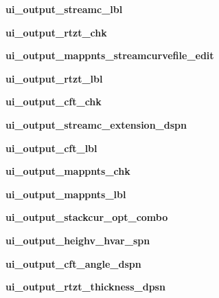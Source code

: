 \begin{DoxyCompactItemize}
\hypertarget{a00077_a1436e56fad76cd38cf1f87db08b539b8}{}\label{a00077_a1436e56fad76cd38cf1f87db08b539b8} 
{\bfseries ui\+\_\+output\+\_\+streamc\+\_\+lbl}
\item 
\hypertarget{a00077_a336846c91ac57b8ab8ab0f2b5c5a0b9e}{}\label{a00077_a336846c91ac57b8ab8ab0f2b5c5a0b9e} 
{\bfseries ui\+\_\+output\+\_\+rtzt\+\_\+chk}
\item 
\hypertarget{a00077_a806b947963fcab17402d6c5b4cc16368}{}\label{a00077_a806b947963fcab17402d6c5b4cc16368} 
{\bfseries ui\+\_\+output\+\_\+mappnts\+\_\+streamcurvefile\+\_\+edit}
\item 
\hypertarget{a00077_a17ad2111dee7da23381837dc87ce9a6c}{}\label{a00077_a17ad2111dee7da23381837dc87ce9a6c} 
{\bfseries ui\+\_\+output\+\_\+rtzt\+\_\+lbl}
\item 
\hypertarget{a00077_a1b032189cdd7d3d01263d73bfd778d92}{}\label{a00077_a1b032189cdd7d3d01263d73bfd778d92} 
{\bfseries ui\+\_\+output\+\_\+cft\+\_\+chk}
\item 
\hypertarget{a00077_ae4dbdbe6b6da83089c1ae51bb6cdb1e2}{}\label{a00077_ae4dbdbe6b6da83089c1ae51bb6cdb1e2} 
{\bfseries ui\+\_\+output\+\_\+streamc\+\_\+extension\+\_\+dspn}
\item 
\hypertarget{a00077_ac2158a8a751f8d5478c20a551799d3b1}{}\label{a00077_ac2158a8a751f8d5478c20a551799d3b1} 
{\bfseries ui\+\_\+output\+\_\+cft\+\_\+lbl}
\item 
\hypertarget{a00077_afcb54ff967d6a7fc001c9714f038ab80}{}\label{a00077_afcb54ff967d6a7fc001c9714f038ab80} 
{\bfseries ui\+\_\+output\+\_\+mappnts\+\_\+chk}
\item 
\hypertarget{a00077_a96c4756f82fdfe6fa5385898c3d96a91}{}\label{a00077_a96c4756f82fdfe6fa5385898c3d96a91} 
{\bfseries ui\+\_\+output\+\_\+mappnts\+\_\+lbl}
\item 
\hypertarget{a00077_a9a81933c3dedf38f28446661eb6796fa}{}\label{a00077_a9a81933c3dedf38f28446661eb6796fa} 
{\bfseries ui\+\_\+output\+\_\+stackcur\+\_\+opt\+\_\+combo}
\item 
\hypertarget{a00077_af92fe733419818e322c45b716966440b}{}\label{a00077_af92fe733419818e322c45b716966440b} 
{\bfseries ui\+\_\+output\+\_\+heighv\+\_\+hvar\+\_\+spn}
\item 
\hypertarget{a00077_aa8751b98f2848d66d991f668a8061b50}{}\label{a00077_aa8751b98f2848d66d991f668a8061b50} 
{\bfseries ui\+\_\+output\+\_\+cft\+\_\+angle\+\_\+dspn}
\item 
\hypertarget{a00077_a0ce457bc120667aadadd3ade828c65b3}{}\label{a00077_a0ce457bc120667aadadd3ade828c65b3} 
{\bfseries ui\+\_\+output\+\_\+rtzt\+\_\+thickness\+\_\+dpsn}

\end{DoxyCompactItemize}
